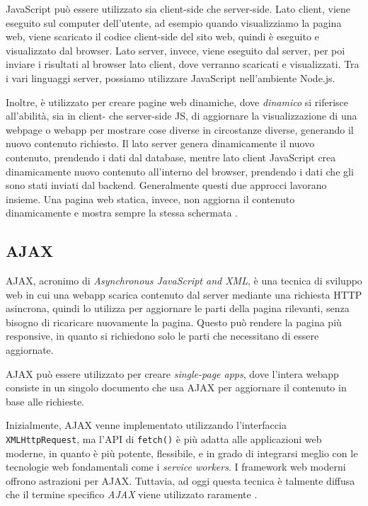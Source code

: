 JavaScript può essere utilizzato sia client-side che server-side. Lato client, viene eseguito sul computer dell'utente, ad esempio quando visualizziamo la pagina web, viene scaricato il codice client-side del sito web, quindi è eseguito e visualizzato dal browser. Lato server, invece, viene eseguito dal server, per poi inviare i risultati al browser lato client, dove verranno scaricati e visualizzati. Tra i vari linguaggi server, possiamo utilizzare JavaScript nell'ambiente Node.js.

Inoltre, è utilizzato per creare pagine web dinamiche, dove \textit{dinamico} si riferisce all'abilità, sia in client- che server-side JS, di aggiornare la visualizzazione di una webpage o webapp per mostrare cose diverse in circostanze diverse, generando il nuovo contenuto richiesto. Il lato server genera dinamicamente il nuovo contenuto, prendendo i dati dal database, mentre lato client JavaScript crea dinamicamente nuovo contenuto all'interno del browser, prendendo i dati che gli sono stati inviati dal backend. Generalmente questi due approcci lavorano insieme. Una pagina web statica, invece, non aggiorna il contenuto dinamicamente e mostra sempre la stessa schermata \cite{JavaScript}.

\subsection{AJAX}
AJAX, acronimo di \textit{Asynchronous JavaScript and XML}, è una tecnica di sviluppo web in cui una webapp scarica contenuto dal server mediante una richiesta HTTP asincrona, quindi lo utilizza per aggiornare le parti della pagina rilevanti, senza bisogno di ricaricare nuovamente la pagina. Questo può rendere la pagina più responsive, in quanto si richiedono solo le parti che necessitano di essere aggiornate.

AJAX può essere utilizzato per creare \textit{single-page apps}, dove l'intera webapp consiste in un singolo documento che usa AJAX per aggiornare il contenuto in base alle richieste.

Inizialmente, AJAX venne implementato utilizzando l'interfaccia \\\Verb_XMLHttpRequest_, ma l'API di \Verb_fetch()_ è più adatta alle applicazioni web moderne, in quanto è più potente, flessibile, e in grado di integrarsi meglio con le tecnologie web fondamentali come i \textit{service workers}. I framework web moderni offrono astrazioni per AJAX. Tuttavia, ad oggi questa tecnica è talmente diffusa che il termine specifico \textit{AJAX} viene utilizzato raramente \cite{AJAX}.

